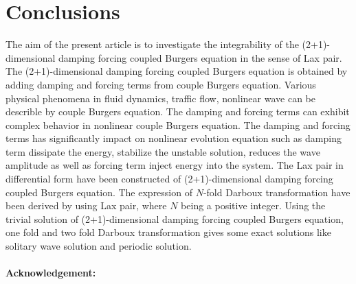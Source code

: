 \documentclass{article}%
\begin{document}
\section{Conclusions}
The  aim of the present article is to investigate the integrability of the  (2+1)-dimensional damping forcing coupled Burgers equation in the sense of Lax pair. The (2+1)-dimensional damping forcing coupled Burgers equation is obtained by adding damping and forcing terms from couple Burgers equation. Various physical phenomena in fluid dynamics, traffic flow, nonlinear wave can be describle by couple Burgers equation. The damping and forcing terms can exhibit complex behavior in nonlinear couple Burgers equation. The damping and forcing terms has significantly impact on nonlinear evolution equation such as damping term dissipate the energy, stabilize the unstable solution, reduces the wave amplitude as well as forcing term inject energy into the system. The Lax pair in differential form have been constructed of (2+1)-dimensional damping forcing coupled Burgers equation. The expression of  $N$-fold Darboux transformation have been derived by using Lax pair, where $N$ being a positive integer. Using the trivial solution of (2+1)-dimensional damping forcing coupled Burgers equation, one fold and two fold Darboux transformation gives some exact solutions like solitary wave solution and periodic solution.  \\\\
\noindent
\textbf{Acknowledgement:}%
\end{document}
